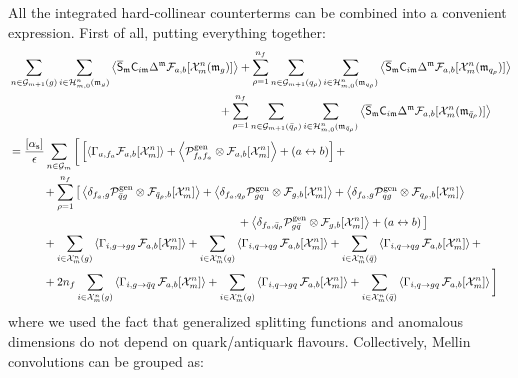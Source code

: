 All the integrated hard-collinear counterterms can be combined into a convenient expression. First of all, putting everything together:
\begin{equation*}
  \begin{split}
    & \sum_{n \in \mathcal{G}_{m+1}(g)} \sum_{i \in \mathcal{H}^{n}_{m,0}(\mathfrak{m}_g)} \left\langle \overline{\mathsf{S}}_{\mathfrak{m}} \mathsf{C}_{i\mathfrak{m}} \Delta^{\mathfrak{m}} \mathcal{F}_{a,b}[\mathcal{X}^{n}_{m}(\mathfrak{m}_g)] \right\rangle + \sum_{\rho = 1}^{n_f} \sum_{n \in \mathcal{G}_{m+1}(q_\rho)} \sum_{i \in \mathcal{H}^{n}_{m,0}(\mathfrak{m}_{q_\rho})} \left\langle \overline{\mathsf{S}}_{\mathfrak{m}} \mathsf{C}_{i\mathfrak{m}} \Delta^{\mathfrak{m}} \mathcal{F}_{a,b}[\mathcal{X}^{n}_{m}(\mathfrak{m}_{q_\rho})] \right\rangle \\
    & \qquad \qquad \qquad \qquad \qquad \qquad \qquad \qquad \qquad \,\, + \sum_{\rho = 1}^{n_f} \sum_{n \in \mathcal{G}_{m+1}(\bar{q}_\rho)} \sum_{i \in \mathcal{H}^{n}_{m,0}(\mathfrak{m}_{\bar{q}_\rho})} \left\langle \overline{\mathsf{S}}_{\mathfrak{m}} \mathsf{C}_{i\mathfrak{m}} \Delta^{\mathfrak{m}} \mathcal{F}_{a,b}[\mathcal{X}^{n}_{m}(\mathfrak{m}_{\bar{q}_\rho})] \right\rangle \\
    & = \frac{[\alpha_\text{s}]}{\epsilon} \sum_{n \in \mathcal{G}_m} \bigg[ \left[ \left\langle \Gamma_{a,f_a} \mathcal{F}_{a,b}[\mathcal{X}^{n}_{m}] \right\rangle + \left\langle \mathcal{P}^\text{gen}_{f_a f_a} \otimes \mathcal{F}_{a,b}[\mathcal{X}^{n}_{m}] \right\rangle + \left( a \leftrightarrow b \right) \right] + \\
    & \qquad \quad + \sum_{\rho = 1}^{n_f} \big[ \left\langle \delta_{f_a , g} \mathcal{P}^\text{gen}_{\bar{q} g} \otimes \mathcal{F}_{\bar{q}_\rho , b}[\mathcal{X}^{n}_{m}] \right\rangle + \left\langle \delta_{f_a , q_\rho} \mathcal{P}^\text{gen}_{gq} \otimes \mathcal{F}_{g,b}[\mathcal{X}^{n}_{m}] \right\rangle + \left\langle \delta_{f_a , g} \mathcal{P}^\text{gen}_{q g} \otimes \mathcal{F}_{q_\rho , b}[\mathcal{X}^{n}_{m}] \right\rangle \\
    & \qquad \qquad \qquad \qquad \qquad \qquad \qquad \qquad \qquad \qquad + \left\langle \delta_{f_a , \bar{q}_\rho} \mathcal{P}^\text{gen}_{g \bar{q}} \otimes \mathcal{F}_{g,b}[\mathcal{X}^{n}_{m}] \right\rangle + \left( a \leftrightarrow b\right) \big] \\
    & \qquad \quad + \sum_{i \in \mathcal{X}^{n}_{m}(g)} \left\langle \Gamma_{i, g \rightarrow g g} \,\mathcal{F}_{a,b}[\mathcal{X}^{n}_{m}] \right\rangle + \sum_{i \in \mathcal{X}^{n}_{m}(q)} \left\langle \Gamma_{i, q \rightarrow q g} \,\mathcal{F}_{a,b}[\mathcal{X}^{n}_{m}] \right\rangle + \sum_{i \in \mathcal{X}^{n}_{m}(\bar{q})} \left\langle \Gamma_{i, q \rightarrow q g} \,\mathcal{F}_{a,b}[\mathcal{X}^{n}_{m}] \right\rangle + \\
    & \qquad \quad + 2n_f \sum_{i \in \mathcal{X}^{n}_{m}(g)} \left\langle \Gamma_{i , g \rightarrow \bar{q} q} \,\mathcal{F}_{a,b}[\mathcal{X}^{n}_{m}] \right\rangle + \sum_{i \in \mathcal{X}^{n}_{m}(q)} \left\langle \Gamma_{i , q \rightarrow g q} \,\mathcal{F}_{a,b}[\mathcal{X}^{n}_{m}] \right\rangle + \sum_{i \in \mathcal{X}^{n}_{m}(\bar{q})} \left\langle \Gamma_{i , q \rightarrow g q} \,\mathcal{F}_{a,b}[\mathcal{X}^{n}_{m}] \right\rangle \bigg]
  \end{split}
\end{equation*}
where we used the fact that generalized splitting functions and anomalous dimensions do not depend on quark/antiquark flavours. Collectively, Mellin convolutions can be grouped as:
